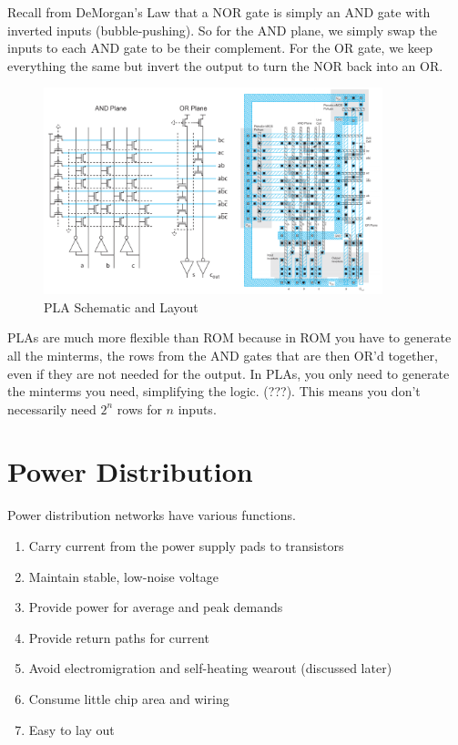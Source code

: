 \documentclass{article}
\begin{document}
Recall from DeMorgan's Law that a NOR gate is simply an AND gate with inverted inputs (bubble-pushing). So for the AND plane, we simply swap the inputs to each AND gate to be their complement. For the OR gate, we keep everything the same but invert the output to turn the NOR back into an OR.

\begin{figure}[ht!]
\centering
\includegraphics[height=60mm]{PLASchematic.png}
\caption{PLA Schematic and Layout}
\end{figure}

PLAs are much more flexible than ROM because in ROM you have to generate all the minterms, the rows from the AND gates that are then OR'd together, even if they are not needed for the output. In PLAs, you only need to generate the minterms you need, simplifying the logic. (???). This means you don't necessarily need $2^n$ rows for $n$ inputs.


\section{Power Distribution}

Power distribution networks have various functions.

\begin{enumerate}
\item Carry current from the power supply pads to transistors
\item Maintain stable, low-noise voltage
\item Provide power for average and peak demands
\item Provide return paths for current
\item Avoid electromigration and self-heating wearout (discussed later)
\item Consume little chip area and wiring
\item Easy to lay out
\end{enumerate}
\end{document}
